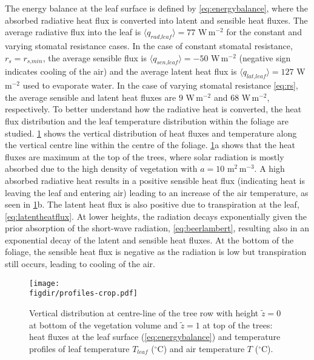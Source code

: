 The energy balance at the leaf surface is defined by \cref{eq:energybalance}, where the absorbed radiative heat flux is converted into latent and sensible heat fluxes. The average radiative flux into the leaf is $\langle q_{\textit{rad,leaf}} \rangle =77$ W\,m$^{-2}$ for the constant and varying stomatal resistance cases. In the case of constant stomatal resistance, $r_s=r_{\textit{s,min}}$, the average sensible flux is $\langle q_{\textit{sen,leaf}} \rangle = -50$ W\,m$^{-2}$ (negative sign indicates cooling of the air) and the average latent heat flux is $\langle q_{\textit{lat,leaf}} \rangle =127$ W\,m$^{-2}$ used to evaporate water. In the case of varying stomatal resistance \cref{eq:rs}, the average sensible and latent heat fluxes are $9$ W\,m$^{-2}$ and $68$ W\,m$^{-2}$, respectively. To better understand how the radiative heat is converted, the heat flux distribution and the leaf temperature distribution within the foliage are studied. \cref{fig:profiles2} shows the vertical distribution of heat fluxes and temperature along the vertical centre line within the centre of the foliage. \cref{fig:profiles2}a shows that the heat fluxes are maximum at the top of the trees, where solar radiation is mostly absorbed due to the high density of vegetation with $a=10$ m$^2$\,m$^{-3}$. A high absorbed radiative heat results in a positive sensible heat flux (indicating heat is leaving the leaf and entering air) leading to an increase of the air temperature, as seen in \cref{fig:profiles2}b. The latent heat flux is also positive due to transpiration at the leaf, \cref{eq:latentheatflux}. At lower heights, the radiation decays exponentially given the prior absorption of the short-wave radiation, \cref{eq:beerlambert}, resulting also in an exponential decay of the latent and sensible heat fluxes. At the bottom of the foliage, the sensible heat flux is negative as the radiation is low but transpiration still occurs, leading to cooling of the air. 

	\begin{figure}[t]
	\centering
	\texttt{[image: \\figdir/profiles-crop.pdf]}
	\caption{Vertical distribution at centre-line of the tree row with height  $\tilde{z}=0$ at bottom of the vegetation volume and  $\tilde{z}=1$ at top of the trees:  heat fluxes at the leaf surface (\cref{eq:energybalance}) and  temperature profiles of leaf temperature $T_{\textit{leaf}}$ ($^{\circ}$C) and air temperature $T$ ($^{\circ}$C).}
	\label{fig:profiles2}
	\end{figure}

